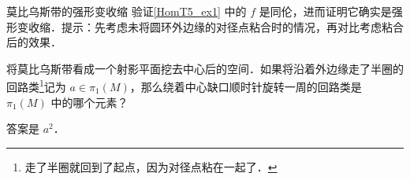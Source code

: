 \begin{exercise}{莫比乌斯带的强形变收缩}
验证\autoref{HomT5_ex1} 中的 $f$ 是同伦，进而证明它确实是强形变收缩．提示：先考虑未将圆环外边缘的对径点粘合时的情况，再对比考虑粘合后的效果．
\end{exercise}

\begin{exercise}{}
将莫比乌斯带看成一个射影平面挖去中心后的空间．如果将沿着外边缘走了半圈的回路类\footnote{走了半圈就回到了起点，因为对径点粘在一起了．}记为 $a\in\pi_1(M)$，那么绕着中心缺口顺时针旋转一周的回路类是 $\pi_1(M)$ 中的哪个元素？

答案是 $a^2$．
\end{exercise}



